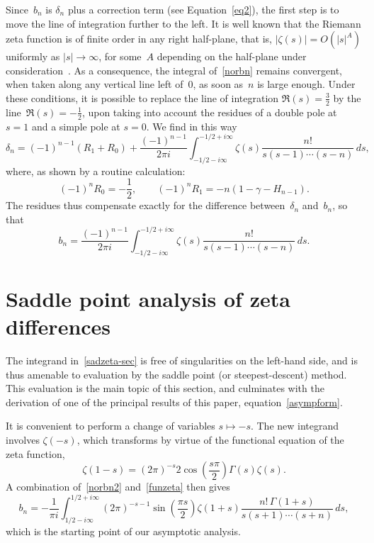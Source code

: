 \documentclass{amsart}
\begin{document}
Since~$b_n$ is $\delta_n$ plus a correction term (see Equation~\eqref{eq2}),
the first step is to move the line of integration further to the left.
It is well known that the Riemann zeta function is of finite order in any right half-plane,
that is, $|\zeta(s)|=O(|s|^A)$ uniformly as $|s|\to\infty$, for some~$A$ depending on the
half-plane under consideration~\cite{Titchmarsh86}.
As a consequence, the integral of~\eqref{norbn} remains 
convergent, when taken along any vertical line left of~0,
as soon as~$n$ is large enough. Under these conditions, it is possible
to replace the line of integration $\Re(s)=\frac32$ by the line~$\Re(s)=-\frac12$, upon
taking into account the residues of a double pole at $s=1$ and a simple
pole at $s=0$.
We find in this way
\[
\delta_n=(-1)^{n-1} (R_1+R_0)+\frac{(-1)^{n-1}}{2\pi i}\int_{-1/2-i\infty}^{-1/2+i\infty} 
\zeta(s) \frac{n!}{s(s-1)\cdots(s-n)}\, ds, \]
where, as shown by a routine calculation:
\[
(-1)^n R_0=-\frac12,
\qquad
(-1)^nR_1=-n(1-\gamma-H_{n-1}).
\]
The residues thus compensate exactly 
for the difference between~$\delta_n$ and~$b_n$, so that
\begin{equation}\label{norbn2}
b_n=
\frac{(-1)^{n-1}}{2\pi i}\int_{-1/2-i\infty}^{-1/2+i\infty} 
\zeta(s) \frac{n!}{s(s-1)\cdots(s-n)}\, ds.
\end{equation}

\section{Saddle point analysis of zeta differences}\label{sadzeta-sec}

The integrand in~\eqref{sadzeta-sec} is free of 
singularities on the left-hand side, and is thus amenable to evaluation
by the saddle point (or steepest-descent) method.  This evaluation 
is the main topic of this section, and culminates with the derivation of
one of the principal results of this paper, equation~\eqref{asympform}.

It is convenient to perform a change of variables $s\mapsto -s$.
The new integrand involves $\zeta(-s)$, which transforms by virtue of the 
functional equation 
of the zeta function,
\begin{equation}\label{funzeta}
\zeta(1-s)=(2\pi)^{-s}2\cos\left(\frac{s\pi}{2}\right)\Gamma(s)\zeta(s).
\end{equation}
A combination of~\eqref{norbn2} and~\eqref{funzeta} then gives
\begin{equation}\label{mainint}
b_n = -\frac{1}{\pi i} 
\int_{1/2-i\infty}^{1/2+i\infty} 
(2\pi)^{-s-1} \sin\left(\frac{\pi s}{2}\right)\zeta(1+s)
\frac{n!\,\Gamma(1+s)}{s(s+1)\cdots(s+n)}\, ds,
\end{equation}
which is the starting point of our asymptotic analysis.
\end{document}
